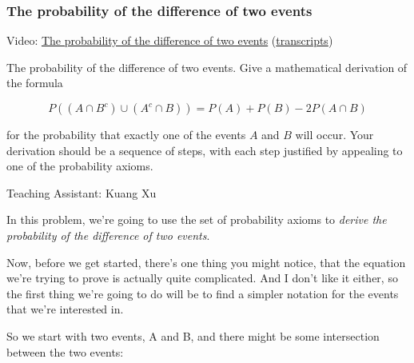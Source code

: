 \documentclass[pdftex, brazil, 12pt, twoside]{article}
\begin{document}
\subsubsection{The probability of the difference of two events}
\label{un1-solved-problems-difference-of-two-events}

Video: \href{https://www.youtube.com/watch?v=QahIePbC29E}{The probability of the difference of two events}
(\href{Unit-1/03\_solved\_problems/sp\_1\_transcripts.jpg}{transcripts})

The probability of the difference of two events. Give a mathematical derivation of the formula

\begin{equation*}
  P\left((A \cap B^c) \cup (A^c \cap B)\right) = P(A) + P(B) - 2P(A \cap B)
\end{equation*}

for the probability that exactly one of the events $A$ and $B$ will occur.
Your derivation should be a sequence of steps, with each step justified by
appealing to one of the probability axioms.

Teaching Assistant: Kuang Xu

In this problem, we're going to use the set of probability
axioms to \emph{derive the probability of the difference of two
events}.

Now, before we get started, there's
one thing you might notice, that the equation
we're trying to prove is actually quite complicated.
And I don't like it either, so the first thing
we're going to do will be to find a simpler notation
for the events that we're interested in.

So we start with two events, A and B,
and there might be some intersection between the two
events:

\begin{figure}[H]
  \begin{center}
  \end{center}
\end{figure}
\end{document}
